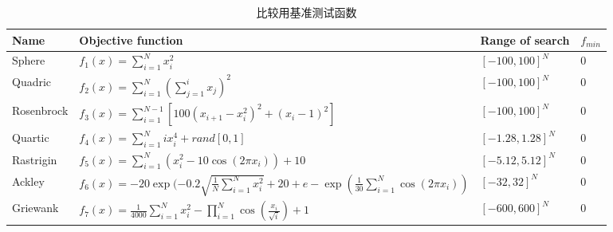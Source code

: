 \begin{table*}[!htb]
\begin{center}
\caption{比较用基准测试函数}
\label{tab:test2}
\vspace{0.5em}\centering
\begin{tabularx}{0.98\textwidth}{p{1.5cm}p{8.5cm}p{2.45cm}p{0.5cm}}
\hline
Name&   Objective function   	&   Range of search    &   $f_{min}$ 	 \\
\midrule
Sphere&  $f_1(x)=\sum^{N}_{i=1}x^2_i$    &   $[-100,100]^N$&  $0$\\
Quadric&  $f_2(x)=\sum^{N}_{i=1}(\sum^i_{j=1}x_j)^2$&  $[-100,100]^N$&  $0$\\
Rosenbrock&  $f_3(x)=\sum_{i=1}^{N-1} [100(x_{i+1}-x_i^2)^2 + (x_i-1)^2]$  &  $[-100,100]^N$ &   $0$\\
Quartic &  $f_4(x)=\sum_{i=1}^{N}ix_i^4+rand[0, 1]$&  $[-1.28,1.28]^N$&  $0$\\
Rastrigin&  $f_5(x)=\sum_{i=1}^{N}(x_i^2-10\cos(2\pi x_i))+10$&  $[-5.12,5.12]^N$&  $0$\\
Ackley&  $f_{6}(x) = -20 \exp(-0.2 \sqrt{ \frac{1}{N} \sum_{i=1}^{N}{x_i^2}}+ 20 + e - \exp( \frac{1}{30} \sum_{i=1}^{N} \cos{(2\pi x_i)})  $ &   $[-32,32]^N$ &   $0$\\
Griewank&  $f_{7}(x)=\frac{1}{4000}\sum_{i=1}^{N}{x_i^2}-\prod_{i=1}^{N}\cos(\frac{x_i}{\sqrt{i}})+1$
&  $[-600,600]^N$&  $0$\\
\hline
\end{tabularx}
\end{center}
\end{table*}
